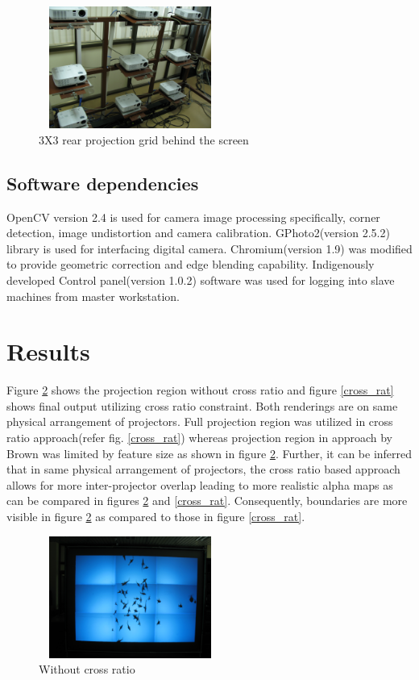 \documentclass[conference]{/home/pranav/Desktop/Publication_work/latex_class_files/IEEEtran}
\begin{document}
\begin{figure}
\centering
\includegraphics[width=6cm,height=4cm]{figures/projs.jpg}
\caption{3X3 rear projection grid behind the screen}
\label{projs}
\end{figure}

\subsection{Software dependencies}
OpenCV version 2.4 is used for camera image processing specifically, corner detection, image undistortion and camera calibration. GPhoto2(version 2.5.2) library is used for interfacing digital camera. Chromium(version 1.9) was modified to provide geometric correction and edge blending capability. Indigenously developed Control panel(version 1.0.2) software was used for logging into slave machines from master workstation.


\section{Results}
Figure \ref{non_cross_rat} shows the projection region without cross ratio and figure \ref{cross_rat} shows final output utilizing cross ratio constraint. Both renderings are on same physical arrangement of projectors. Full projection region was utilized in cross ratio approach(refer fig. \ref{cross_rat}) whereas projection region in approach by Brown\cite{2} was limited by feature size as shown in figure \ref{non_cross_rat}. \newline 
Further, it can be inferred that in same physical arrangement of projectors, the cross ratio based approach allows for more inter-projector overlap leading to more realistic alpha maps as can be compared in figures \ref{non_cross_rat} and \ref{cross_rat}. Consequently, boundaries are more visible in figure \ref{non_cross_rat} as compared to those in figure \ref{cross_rat}.

\begin{figure}
\centering
\includegraphics[width=6cm,height=4cm]{figures/without_cross_rat.jpg}
\caption{Without cross ratio}
\label{non_cross_rat}
\end{figure}
\end{document}
